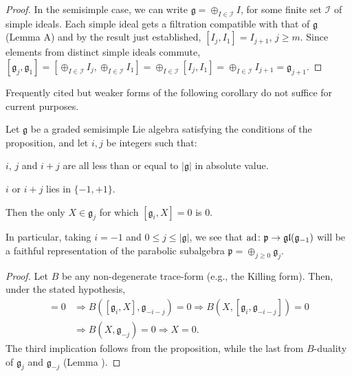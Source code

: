 \documentclass[leqno,12pt]{amsart} %
\begin{document}
\begin{proof}
  In the semisimple case, we can write ${\mathfrak g} = \oplus_{I \in {\mathcal I}}I$, for
  some finite set ${\mathcal I} $ of simple ideals. Each simple ideal gets a filtration
  compatible with that of ${\mathfrak g}$ (Lemma A) and by the result just established,
  $[I_j, I_1]=I_{j+1}$, $j\ge m$. Since elements from distinct simple ideals commute,
  $[{\mathfrak g}_j, {\mathfrak g}_1]=[\oplus_{I \in {\mathcal I}}I_j, \oplus_{I \in
    {\mathcal I}}I_1]=\oplus_{I \in {\mathcal I}}[I_j, I_1]=\oplus_{I \in {\mathcal
      I}}I_{j+1}={\mathfrak g}_{j+1}$.
\end{proof}

Frequently cited but weaker forms of the following corollary do not suffice for current
purposes.

\begin{corollary}
  Let ${\mathfrak g} $ be a graded semisimple Lie algebra satisfying the conditions of the
  proposition, and let $i, j$ be integers such that:
  \begin{conditions}
  \item $i$, $j$ and $i + j$ are all less than or equal to $|{\mathfrak g}|$ in absolute
    value.
      \item $i$ or $i+j$ lies in $\{-1, +1\}$.
  \end{conditions}
  Then the only $X \in {\mathfrak g}_j$ for which $[{\mathfrak g}_i, X] = 0$ is $0$.
\end{corollary}

\begin{remark}
  In particular, taking $i=-1$ and $0 \le j \le |{\mathfrak g}|$, we see that
  $\operatorname{ad} \colon {\mathfrak p} \rightarrow \mathfrak{gl}({\mathfrak g}_{-1})$ will be a faithful
  representation of the parabolic subalgebra
  ${\mathfrak p} = \oplus_{j\ge 0}{\mathfrak g}_j$.
\end{remark}
\begin{proof}
  Let $B$ be any non-degenerate trace-form (e.g., the Killing form). Then, under the
  stated hypothesis,
  \begin{align*}
    [{\mathfrak g}_i, X] =0 &\Rightarrow B([{\mathfrak g}_i, X], {\mathfrak g}_{-i-j}) = 0
                              \Rightarrow B(X, [{\mathfrak g}_i, {\mathfrak g}_{-i-j}]) = 0\\
                            &\Rightarrow B(X, {\mathfrak g}_{-j})=0
                              \Rightarrow X = 0.
  \end{align*}
  The third implication follows from the proposition, while the last from $B$-duality of
  ${\mathfrak g}_j$ and ${\mathfrak g}_{-j}$ (Lemma ).
\end{proof}
\end{document}
